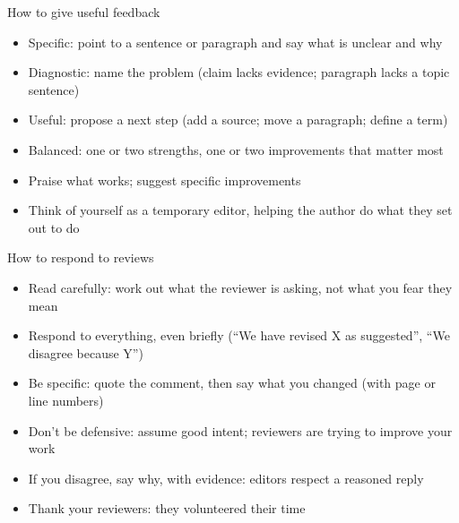 \documentclass[aspectratio=169]{beamer}
\begin{document}
\begin{frame}{How to give useful feedback}
\begin{itemize}
  \item Specific: point to a sentence or paragraph and say what is unclear and why
  \item Diagnostic: name the problem (claim lacks evidence; paragraph lacks a topic sentence)
  \item Useful: propose a next step (add a source; move a paragraph; define a term)
  \item Balanced: one or two strengths, one or two improvements that matter most
  \item Praise what works; suggest specific improvements
  \item Think of yourself as a temporary editor, helping the author do what they set out to do
\end{itemize}
\end{frame}

\begin{frame}{How to respond to reviews}
\begin{itemize}
  \item Read carefully: work out what the reviewer is asking, not what you fear they mean
  \item Respond to everything, even briefly (``We have revised X as suggested'', ``We disagree because Y'')
  \item Be specific: quote the comment, then say what you changed (with page or line numbers)
  \item Don't be defensive: assume good intent; reviewers are trying to improve your work
  \item If you disagree, say why, with evidence: editors respect a reasoned reply
  \item Thank your reviewers: they volunteered their time
\end{itemize}
\end{frame}
\end{document}
